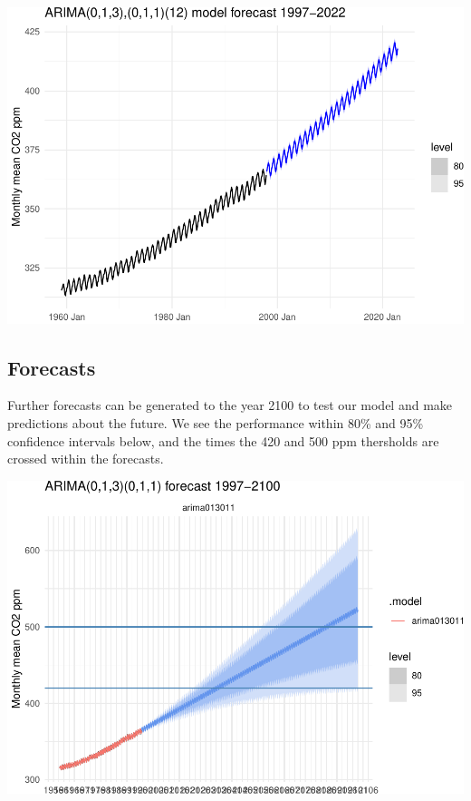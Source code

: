 \documentclass[AER]{AEA}
\begin{document}
\includegraphics{co2_1997_Qian_files/figure-latex/ARIMA Forecast till 2020-1.pdf}

\hypertarget{forecasts}{%
\subsection{Forecasts}\label{forecasts}}

Further forecasts can be generated to the year 2100 to test our model
and make predictions about the future. We see the performance within
80\% and 95\% confidence intervals below, and the times the 420 and 500
ppm thersholds are crossed within the forecasts.

\includegraphics{co2_1997_Qian_files/figure-latex/ARIMA forecast plot-1.pdf}
\end{document}
